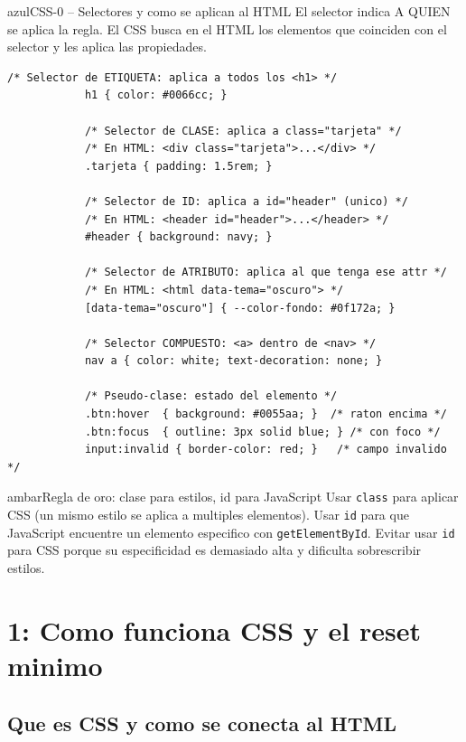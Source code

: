 \documentclass[11pt,a4paper]{article}
\begin{document}
	\begin{cajacodigo}{azul}{CSS-0 -- Selectores y como se aplican al HTML}
		{\color{codigotexto}\small El selector indica A QUIEN se aplica la regla. El CSS busca en el HTML los elementos que coinciden con el selector y les aplica las propiedades.}
		\begin{lstlisting}[style=codecss]
			/* Selector de ETIQUETA: aplica a todos los <h1> */
			h1 { color: #0066cc; }
			
			/* Selector de CLASE: aplica a class="tarjeta" */
			/* En HTML: <div class="tarjeta">...</div> */
			.tarjeta { padding: 1.5rem; }
			
			/* Selector de ID: aplica a id="header" (unico) */
			/* En HTML: <header id="header">...</header> */
			#header { background: navy; }
			
			/* Selector de ATRIBUTO: aplica al que tenga ese attr */
			/* En HTML: <html data-tema="oscuro"> */
			[data-tema="oscuro"] { --color-fondo: #0f172a; }
			
			/* Selector COMPUESTO: <a> dentro de <nav> */
			nav a { color: white; text-decoration: none; }
			
			/* Pseudo-clase: estado del elemento */
			.btn:hover  { background: #0055aa; }  /* raton encima */
			.btn:focus  { outline: 3px solid blue; } /* con foco */
			input:invalid { border-color: red; }   /* campo invalido */
		\end{lstlisting}
	\end{cajacodigo}
	
	\begin{cajatip}{ambar}{Regla de oro: clase para estilos, id para JavaScript}
		Usar \texttt{class} para aplicar CSS (un mismo estilo se aplica a multiples elementos). Usar \texttt{id} para que JavaScript encuentre un elemento especifico con \texttt{getElementById}. Evitar usar \texttt{id} para CSS porque su especificidad es demasiado alta y dificulta sobrescribir estilos.
	\end{cajatip}
	
	\section{1: Como funciona CSS y el reset minimo}
	
	\subsection{Que es CSS y como se conecta al HTML}
	
\end{document}
